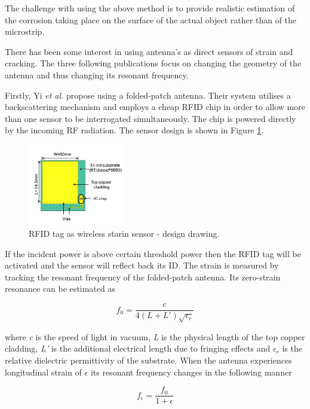 \documentclass[11pt,a4paper]{article}
\begin{document}
The challenge with using the above method is to provide realistic estimation of the corrosion taking place on the surface of the actual object rather than of the microstrip.

There has been some interest in using antenna's as direct sensors of strain and cracking. The three following publications focus on changing the geometry of the antenna and thus changing its resonant frequency.

Firstly, Yi \textit{et al.} \cite{array} propose using a folded-patch antenna. Their system utilises a backscattering mechanism and employs a cheap RFID chip in order to allow more than one sensor to be interrogated simultaneously. The chip is powered directly by the incoming RF radiation. The sensor design is shown in Figure \ref{fig:folded}.

\begin{figure}[h]
\centering
\includegraphics[width=0.375\textwidth]{folded.JPG}
\caption{RFID tag as wireless starin sensor - design drawing.\cite{array}\label{fig:folded}}
\end{figure}

If the incident power is above certain threshold power then the RFID tag will be activated and the sensor will reflect back its ID. The strain is measured by tracking the resonant frequency of the folded-patch antenna. Its zero-strain resonance can be estimated as

\begin{equation}
f_0 = \frac{c}{4(L+L')\sqrt{\epsilon _r}}
\end{equation}

where \textit{c} is the speed of light in vacuum, \textit{L} is the physical length of the top copper cladding, \textit{L'} is the additional electrical length due to fringing effects and $\epsilon _r$ is the relative dielectric permittivity of the substrate. When the antenna experiences longitudinal strain of $\epsilon$ its resonant frequency changes in the following manner

\begin{equation}
f_{\epsilon} = \frac{f_0}{1+\epsilon}
\end{equation}
\end{document}
